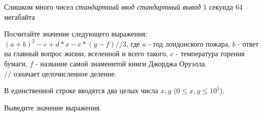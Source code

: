 \begin{problem}%
{Слишком много чисел}%
{\textsl{стандартный ввод}}%
{\textsl{стандартный вывод}}%
{1 секунда}%
{64 мегабайта}{}

Посчитайте значение следующего выражения:
$(a + b)^2 - c + d * x - e * (y - f) // 3$, где $a$ - год лондонского пожара, $b$ - ответ на главный вопрос жизни, вселенной и всего такого, $c$ - температура горения бумаги, $f$ - название самой знаменитой книги Джорджа Оруэлла.\\
$//$ означает целочисленное деление.

\InputFile

В единственной строке вводятся два целых числа $x, y$ ($0 \le x, y \le 10^5$).

\OutputFile

Выведите значение выражения.

\Examples

\begin{example}
%
%
%
\end{example}
\end{problem}
